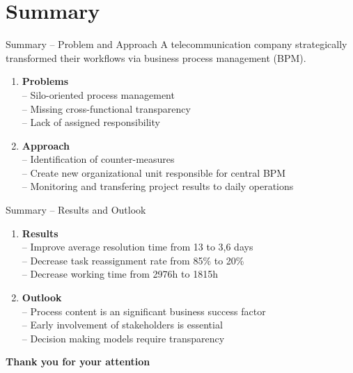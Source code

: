 \documentclass{beamer}
\begin{document}
\section{Summary}
\begin{frame}{Summary -- Problem and Approach}
A telecommunication company strategically transformed their workflows via business process management (BPM).
    \begin{enumerate}[$\circ$]
        \item \textbf{Problems}\\-- Silo-oriented process management\\-- Missing cross-functional transparency\\-- Lack of assigned responsibility
        \item \textbf{Approach}\\-- Identification of counter-measures\\-- Create new organizational unit responsible for central BPM\\-- Monitoring and transfering project results to daily operations
    \end{enumerate}
\end{frame}

\begin{frame}{Summary -- Results and Outlook}
    \begin{enumerate}[$\circ$]
        \item \textbf{Results}\\-- Improve average resolution time from 13 to 3,6 days\\-- Decrease task reassignment rate from 85\% to 20\%\\-- Decrease working time from 2976h to 1815h
        \item \textbf{Outlook}\\-- Process content is an significant business success factor\\-- Early involvement of stakeholders is essential\\-- Decision making models require transparency 
    \end{enumerate}
\end{frame}

\begin{frame}
    \centering \textbf{Thank you for your attention}
\end{frame}
\end{document}
